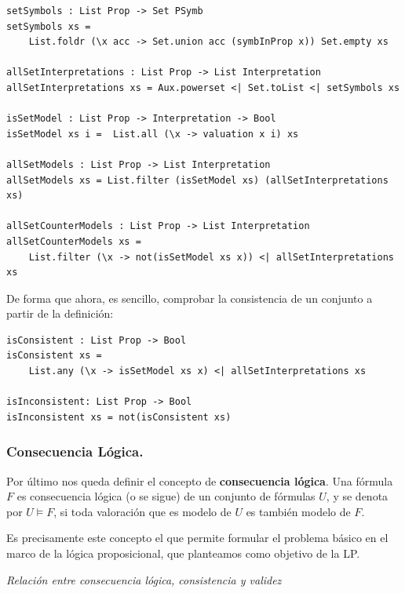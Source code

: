 \documentclass[a4paper]{report}
\begin{document}
\begin{lstlisting}[caption={Modelos y contramodelos en conjuntos de fórmulas proposicionales}]
setSymbols : List Prop -> Set PSymb
setSymbols xs = 
    List.foldr (\x acc -> Set.union acc (symbInProp x)) Set.empty xs

allSetInterpretations : List Prop -> List Interpretation
allSetInterpretations xs = Aux.powerset <| Set.toList <| setSymbols xs
    
isSetModel : List Prop -> Interpretation -> Bool
isSetModel xs i =  List.all (\x -> valuation x i) xs

allSetModels : List Prop -> List Interpretation
allSetModels xs = List.filter (isSetModel xs) (allSetInterpretations xs)

allSetCounterModels : List Prop -> List Interpretation
allSetCounterModels xs = 
    List.filter (\x -> not(isSetModel xs x)) <| allSetInterpretations xs
\end{lstlisting}


De forma que ahora, es sencillo, comprobar la consistencia de un conjunto a partir de la definición:

\begin{lstlisting}[caption={Consistencia e Inconsistencia en Conjuntos Proposicionales}]
isConsistent : List Prop -> Bool
isConsistent xs = 
    List.any (\x -> isSetModel xs x) <| allSetInterpretations xs
    
isInconsistent: List Prop -> Bool
isInconsistent xs = not(isConsistent xs)
\end{lstlisting}

\subsubsection{Consecuencia Lógica.}

Por último nos queda definir el concepto de \textbf{consecuencia lógica}. Una fórmula $F$ es consecuencia lógica (o se sigue) de un conjunto de fórmulas $U$, y se denota por $U \models F$, si toda valoración que es modelo de $U$ es también modelo de $F$.

Es precisamente este concepto el que permite formular el problema básico en el marco de la lógica proposicional, que planteamos como objetivo de la LP.

\noindent\textit{Relación entre consecuencia lógica, consistencia y validez}

\end{document}
